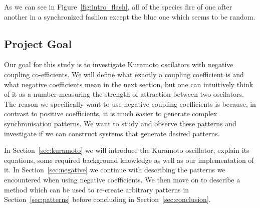 As we can see in Figure~\ref{fig:intro_flash}, all of the species fire of one after another in a synchronized fashion except the blue one which seems to be random. 

\subsection{Project Goal}
Our goal for this study is to investigate Kuramoto oscilators with negative coupling co-efficients. We will define what exactly a coupling coefficient is and what negative coefficients mean in the next section, but one can intuitively think of it as a number measuring the strength of attraction between two oscilators. 
The reason we specifically want to use negative coupling coefficients is because, in contrast to positive coefficients, it is much easier to generate complex synchronisation patterns. We want to study and observe these patterns and investigate if we can construct systems that generate desired patterns. 

In Section~\ref{sec:kuramoto} we will introduce the Kuramoto oscillator, explain its equations, some required background knowledge as well as our implementation of it. In Section~\ref{sec:negative} we continue with describing the patterns we encountered when using negative coefficients. We then move on to describe a method which can be used to re-create arbitrary patterns in Section~\ref{sec:patterns} before concluding in Section~\ref{sec:conclusion}. 